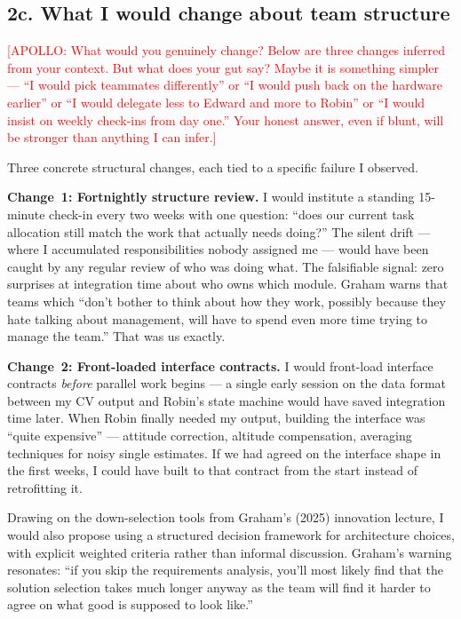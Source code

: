 
\subsection{2c. What I would change about team structure}

\textcolor{red}{[APOLLO: What would you genuinely change? Below are three changes inferred from your context. But what does your gut say? Maybe it is something simpler --- ``I would pick teammates differently'' or ``I would push back on the hardware earlier'' or ``I would delegate less to Edward and more to Robin'' or ``I would insist on weekly check-ins from day one.'' Your honest answer, even if blunt, will be stronger than anything I can infer.]}

Three concrete structural changes, each tied to a specific failure I observed.

\textbf{Change~1: Fortnightly structure review.} I would institute a standing 15-minute check-in every two weeks with one question: ``does our current task allocation still match the work that actually needs doing?'' The silent drift --- where I accumulated responsibilities nobody assigned me --- would have been caught by any regular review of who was doing what. The falsifiable signal: zero surprises at integration time about who owns which module. Graham warns that teams which ``don't bother to think about how they work, possibly because they hate talking about management, will have to spend even more time trying to manage the team.'' That was us exactly.

\textbf{Change~2: Front-loaded interface contracts.} I would front-load interface contracts \textit{before} parallel work begins --- a single early session on the data format between my CV output and Robin's state machine would have saved integration time later. When Robin finally needed my output, building the interface was ``quite expensive'' --- attitude correction, altitude compensation, averaging techniques for noisy single estimates. If we had agreed on the interface shape in the first weeks, I could have built to that contract from the start instead of retrofitting it.

Drawing on the down-selection tools from Graham's (2025) innovation lecture, I would also propose using a structured decision framework for architecture choices, with explicit weighted criteria rather than informal discussion. Graham's warning resonates: ``if you skip the requirements analysis, you'll most likely find that the solution selection takes much longer anyway as the team will find it harder to agree on what good is supposed to look like.''

